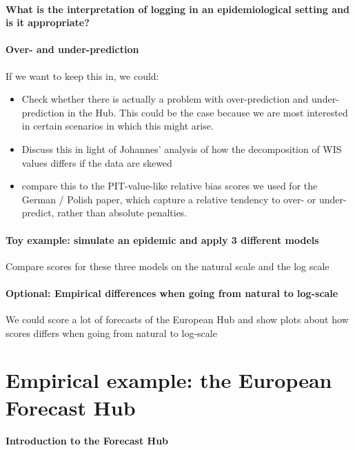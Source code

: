 \documentclass{article}
\begin{document}
\paragraph{What is the interpretation of logging in an epidemiological setting and is it appropriate?}

\paragraph{Over- and under-prediction}
If we want to keep this in, we could: 
\begin{itemize}
    \item Check whether there is actually a problem with over-prediction and under-prediction in the Hub. This could be the case because we are most interested in certain scenarios in which this might arise. 
    \item Discuss this in light of Johannes' analysis of how the decomposition of WIS values differs if the data are skewed
    \item compare this to the PIT-value-like relative bias scores we used for the German / Polish paper, which capture a relative tendency to over- or under-predict, rather than absolute penalties. 
\end{itemize}

\paragraph{Toy example: simulate an epidemic and apply 3 different models} Compare scores for these three models on the natural scale and the log scale

\paragraph{Optional: Empirical differences when going from natural to log-scale} 
We could score a lot of forecasts of the European Hub and show plots about how scores differs when going from natural to log-scale


\section{Empirical example: the European Forecast Hub}

\paragraph{Introduction to the Forecast Hub}
\end{document}
